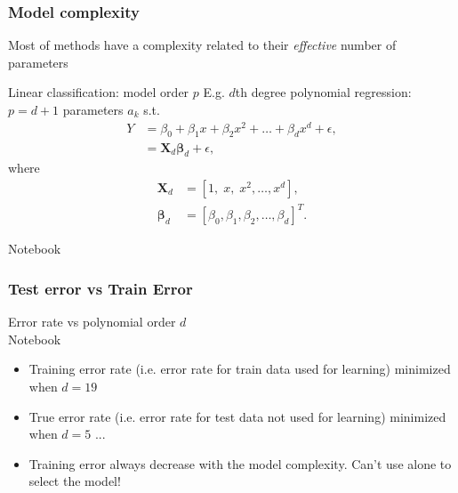 \documentclass[pressentation,9pt,aspectratio=1610,xcolor=table]{beamer}
\newcommand{\doigt}{\noindent \Pisymbol{pzd}{43}}
\begin{document}
\begin{frame}
  \frametitle{Model complexity}
  Most of methods have a complexity related to their {\it effective} number of parameters

  \begin{block}{Linear classification: model order $p$}
  E.g. $d$th degree polynomial regression: $p=d+1$ parameters $a_k$ s.t.
    \begin{align*}
       Y &= \beta_0 + \beta_1 x + \beta_2 x^{2} + \ldots + \beta_d x^{d} + \epsilon,\\
       &= \boldsymbol{X}_d \boldsymbol{\beta}_d + \epsilon,
    \end{align*}
    where
    \begin{align*}
       \boldsymbol{X}_d &= \left[1, \;  x, \;  x^2, \ldots, x^d\right], \\
       \boldsymbol{\beta}_d &= \left[\beta_0, \beta_1, \beta_2, \ldots, \beta_d\right]^T.
    \end{align*}

  \end{block}
  \alert{Notebook}
\end{frame}

\begin{frame}
  \frametitle{Test error vs Train Error}
  
  \begin{minipage}{.45\textwidth}
    \begin{center}
      Error rate vs polynomial order $d$\\
      \alert{Notebook} 
    \end{center}
  \end{minipage}
  \begin{minipage}{.54\textwidth}
    \begin{itemize}
    \item Training error rate (i.e. error rate for train data used for learning) minimized when $d=19$
    \item True error rate (i.e. error rate for test data not used for learning) minimized when $d=5$ ...
  \end{itemize}
\end{minipage}

\begin{itemize}
\item[\doigt] Training error always decrease with the model complexity. \alert{Can't use alone to select the model!}
\end{itemize}


\end{frame}
\end{document}
